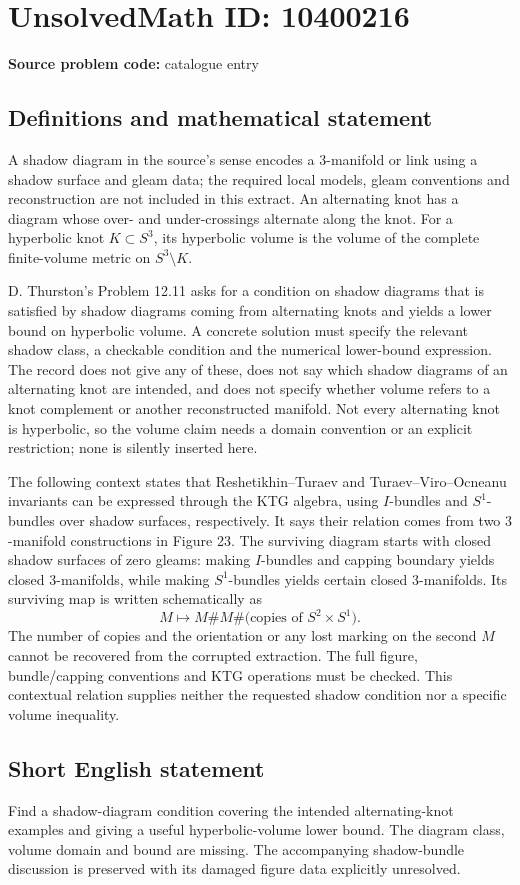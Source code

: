 \documentclass[11pt]{article}
\begin{document}
\section*{UnsolvedMath ID: 10400216}
\textbf{Source problem code:} catalogue entry
\subsection{Definitions and mathematical statement}
A shadow diagram in the source's sense encodes a \(3\)-manifold or link using a shadow surface and gleam data; the required local models, gleam conventions and reconstruction are not included in this extract. An alternating knot has a diagram whose over- and under-crossings alternate along the knot. For a hyperbolic knot \(K\subset S^3\), its hyperbolic volume is the volume of the complete finite-volume metric on \(S^3\setminus K\).

D. Thurston's Problem 12.11 asks for a condition on shadow diagrams that is satisfied by shadow diagrams coming from alternating knots and yields a lower bound on hyperbolic volume. A concrete solution must specify the relevant shadow class, a checkable condition and the numerical lower-bound expression. The record does not give any of these, does not say which shadow diagrams of an alternating knot are intended, and does not specify whether volume refers to a knot complement or another reconstructed manifold. Not every alternating knot is hyperbolic, so the volume claim needs a domain convention or an explicit restriction; none is silently inserted here.

The following context states that Reshetikhin--Turaev and Turaev--Viro--Ocneanu invariants can be expressed through the KTG algebra, using \(I\)-bundles and \(S^1\)-bundles over shadow surfaces, respectively. It says their relation comes from two \(3\)-manifold constructions in Figure 23. The surviving diagram starts with closed shadow surfaces of zero gleams: making \(I\)-bundles and capping boundary yields closed \(3\)-manifolds, while making \(S^1\)-bundles yields certain closed \(3\)-manifolds. Its surviving map is written schematically as
\[
 M\longmapsto M\# M\#\bigl(\text{copies of }S^2\times S^1\bigr).
\]
The number of copies and the orientation or any lost marking on the second \(M\) cannot be recovered from the corrupted extraction. The full figure, bundle/capping conventions and KTG operations must be checked. This contextual relation supplies neither the requested shadow condition nor a specific volume inequality.
\subsection{Short English statement}
Find a shadow-diagram condition covering the intended alternating-knot examples and giving a useful hyperbolic-volume lower bound. The diagram class, volume domain and bound are missing. The accompanying shadow-bundle discussion is preserved with its damaged figure data explicitly unresolved.
\end{document}
